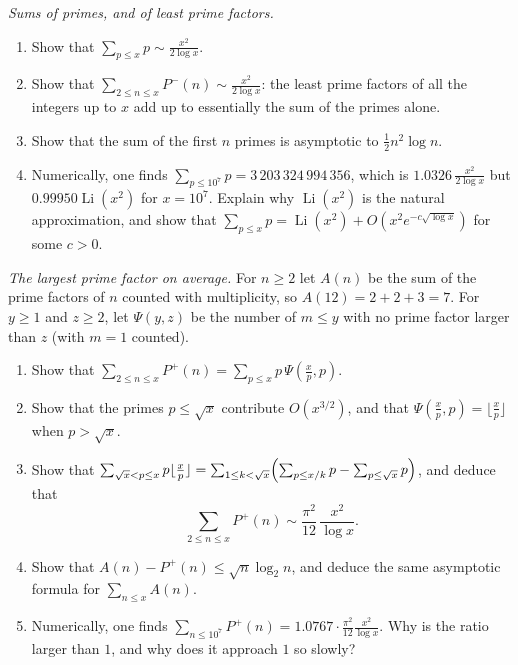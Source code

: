 \begin{exercise}[$\star$]\label{pb:leastpf}
\emph{Sums of primes, and of least prime factors.}
\begin{enumerate}[label=(\alph*)]
\item Show that $\sum_{p\le x}p\sim\frac{x^2}{2\log x}$.
\item Show that $\sum_{2\le n\le x}P^-(n)\sim\frac{x^2}{2\log x}$: the least prime factors of all the integers up to $x$ add up to essentially the sum of the primes alone.
\item Show that the sum of the first $n$ primes is asymptotic to $\frac12n^2\log n$.
\item Numerically, one finds $\sum_{p\le10^7}p=3\,203\,324\,994\,356$, which is $1.0326\,\frac{x^2}{2\log x}$ but $0.99950\operatorname{Li}(x^2)$ for $x=10^7$. Explain why
$\operatorname{Li}(x^2)$ is the natural approximation, and show that $\sum_{p\le x}p=\operatorname{Li}(x^2)+O(x^2e^{-c\sqrt{\log x}})$ for some $c>0$.
\end{enumerate}
\end{exercise}

\begin{exercise}[$\star\star\star$]\label{pb:largestpf}
\emph{The largest prime factor on average.} For $n\ge2$ let $A(n)$ be the sum of the prime factors of $n$ counted with multiplicity, so $A(12)=2+2+3=7$. For $y\ge1$ and
$z\ge2$, let $\Psi(y,z)$ be the number of $m\le y$ with no prime factor larger than $z$ (with $m=1$ counted).
\begin{enumerate}[label=(\alph*)]
\item Show that $\sum_{2\le n\le x}P^+(n)=\sum_{p\le x}p\,\Psi(\frac xp,p)$.
\item Show that the primes $p\le\sqrt x$ contribute $O(x^{3/2})$, and that $\Psi(\frac xp,p)=\lfloor\frac xp\rfloor$ when $p>\sqrt x$.
\item Show that $\sum_{\sqrt x<p\le x}p\lfloor\frac xp\rfloor=\sum_{1\le k<\sqrt x}\Bigl(\sum_{p\le x/k}p-\sum_{p\le\sqrt x}p\Bigr)$, and deduce that
\[
\sum_{2\le n\le x}P^+(n)\sim\frac{\pi^2}{12}\,\frac{x^2}{\log x}.
\]
\item Show that $A(n)-P^+(n)\le\sqrt n\log_2n$, and deduce the same asymptotic formula for $\sum_{n\le x}A(n)$.
\item Numerically, one finds $\sum_{n\le10^7}P^+(n)=1.0767\cdot\frac{\pi^2}{12}\frac{x^2}{\log x}$. Why is the ratio larger than $1$, and why does it approach $1$ so slowly?
\end{enumerate}
\end{exercise}

